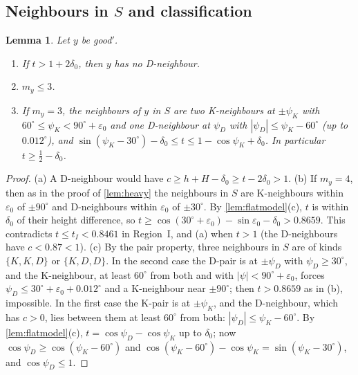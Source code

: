 \documentclass[11pt]{amsart}
\newtheorem{lemma}[theorem]{Lemma}
\theoremstyle{definition}
\theoremstyle{remark}
\newcommand{\eps}{\varepsilon}
\begin{document}
\subsection{Neighbours in \texorpdfstring{$S$}{S} and classification}
\begin{lemma}\label{lem:S3}
Let $y$ be good$'$.
\begin{enumerate}[label=\textup{(\alph*)}]
\item If $t>1+2\delta_0$, then $y$ has no D-neighbour.
\item $m_y\le3$.
\item If $m_y=3$, the neighbours of $y$ in $S$ are two K-neighbours at $\pm\psi_K$ with $60^\circ\le\psi_K<90^\circ+\eps_0$ and one D-neighbour at $\psi_D$ with $|\psi_D|\le\psi_K-60^\circ$ (up to $0.012^\circ$), and $\sin(\psi_K-30^\circ)-\delta_0\le t\le1-\cos\psi_K+\delta_0$. In particular $t\ge\frac12-\delta_0$.
\end{enumerate}
\end{lemma}
\begin{proof}
(a) A D-neighbour would have $c\ge h+H-\delta_0\ge t-2\delta_0>1$. (b) If $m_y=4$, then as in the proof of \cref{lem:heavy} the neighbours in $S$ are K-neighbours within $\eps_0$ of $\pm90^\circ$ and D-neighbours within $\eps_0$ of $\pm30^\circ$. By \cref{lem:flatmodel}(c), $t$ is within $\delta_0$ of their height difference, so $t\ge\cos(30^\circ+\eps_0)-\sin\eps_0-\delta_0>0.8659$. This contradicts $t\le t_I<0.8461$ in Region~I, and (a) when $t>1$ (the D-neighbours have $c<0.87<1$). (c) By the pair property, three neighbours in $S$ are of kinds $\{K,K,D\}$ or $\{K,D,D\}$. In the second case the D-pair is at $\pm\psi_D$ with $\psi_D\ge30^\circ$, and the K-neighbour, at least $60^\circ$ from both and with $|\psi|<90^\circ+\eps_0$, forces $\psi_D\le30^\circ+\eps_0+0.012^\circ$ and a K-neighbour near $\pm90^\circ$; then $t>0.8659$ as in (b), impossible. In the first case the K-pair is at $\pm\psi_K$, and the D-neighbour, which has $c>0$, lies between them at least $60^\circ$ from both: $|\psi_D|\le\psi_K-60^\circ$. By \cref{lem:flatmodel}(c), $t=\cos\psi_D-\cos\psi_K$ up to $\delta_0$; now $\cos\psi_D\ge\cos(\psi_K-60^\circ)$ and $\cos(\psi_K-60^\circ)-\cos\psi_K=\sin(\psi_K-30^\circ)$, and $\cos\psi_D\le1$.
\end{proof}
\end{document}
